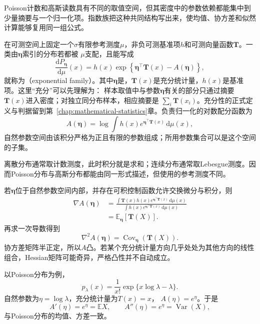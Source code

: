 Poisson计数和高斯读数具有不同的取值空间，但其密度中的参数依赖都能集中到少量摘要与一个归一化项。指数族把这种共同结构写出来，使均值、协方差和似然计算能够复用同一组公式。
\begin{definition}[指数族]
  \label{def:probability-exponential-family}
在可测空间上固定一个\(\sigma\)有限参考测度\(\mu\)，非负可测基准项\(h\)和可测向量函数\(\bm T\)。一类由\(\bm{\eta}\)索引的分布若都被
\(\mu\)支配，且能写成
\begin{equation}
  \frac{\mathrm{d}P_{\bm{\eta}}}{\mathrm{d}\mu}(x)
  =
  h(x)\exp\left\{
    \bm{\eta}^{\top}\bm{T}(x)-A(\bm{\eta})
  \right\},
  \label{eq:probability-exponential-family}
\end{equation}
就称为（exponential family）。其中\(\bm{\eta}\)是，\(\bm{T}(x)\)是充分统计量，\(h(x)\)是基准项。这里“充分”可以先理解为：
样本取值中与参数\(\bm{\eta}\)有关的部分只通过摘要\(\bm{T}(x)\)进入密度；对独立同分布样本，相应摘要是
\(\sum_i\bm{T}(x_i)\)。充分性的正式定义与判据留到第~\ref{chap:mathematical-statistics}章。负责归一化的对数配分函数为
\[ A(\bm{\eta})
  =\log\int h(x)e^{\bm{\eta}^{\top}\bm{T}(x)}\,\mathrm{d}\mu(x), \]
自然参数空间由该积分严格为正且有限的参数组成；所用参数集合可以是这个空间的子集。
\end{definition}
离散分布通常取计数测度，此时积分就是求和；连续分布通常取Lebesgue测度。因而Poisson分布与高斯分布都能由同一形式描述，但使用的参考测度不同。

若\(\bm{\eta}\)位于自然参数空间内部，并存在可积控制函数允许交换微分与积分，则
\[
\begin{aligned}
  \nabla A(\bm{\eta})
  &=
  \frac{\int \bm{T}(x)h(x)
  e^{\bm{\eta}^{\top}\bm{T}(x)}\,\mathrm{d}\mu(x)}
  {\int h(x)e^{\bm{\eta}^{\top}\bm{T}(x)}\,\mathrm{d}\mu(x)}\\
  &=
  \mathbb{E}_{\bm{\eta}}[\bm{T}(X)].
\end{aligned}
\]
再求一次导数得到
\begin{equation}
  \nabla^2 A(\bm{\eta})
  =
  \operatorname{Cov}_{\bm{\eta}}(\bm{T}(X)).
  \label{eq:probability-log-partition-hessian}
\end{equation}
协方差矩阵半正定，所以\(A\)凸。若某个充分统计量方向几乎处处为其他方向的线性组合，Hessian矩阵可能奇异，严格凸性并不自动成立。

以Poisson分布为例，
\[ p_\lambda(x)
  =\frac{1}{x!}\exp\{x\log\lambda-\lambda\}. \]
自然参数为\(\eta=\log\lambda\)，充分统计量为\(T(x)=x\)，
\(A(\eta)=e^\eta\)。于是
\[ A'(\eta)=e^\eta=\mathbb{E}X,
  \qquad A''(\eta)=e^\eta=\operatorname{Var}(X), \]
与Poisson分布的均值、方差一致。

